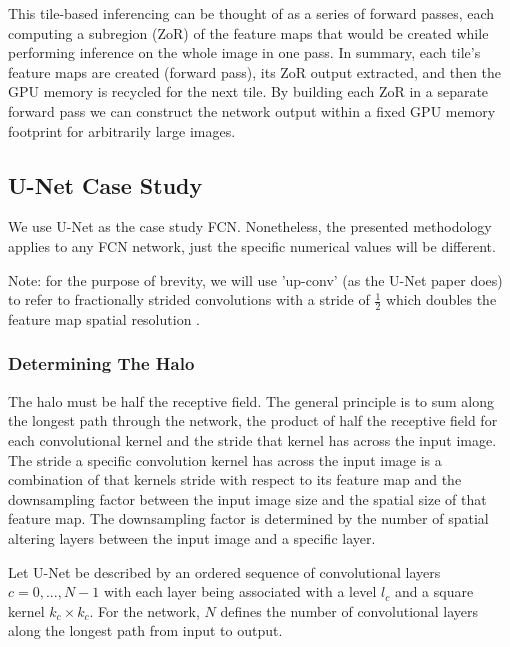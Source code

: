 \documentclass[runningheads]{llncs}
\begin{document}
This tile-based inferencing can be thought of as a series of forward passes, each computing a subregion (ZoR) of the feature maps that would be created while performing inference on the whole image in one pass. 
In summary, each tile's feature maps are created (forward pass), its ZoR output extracted, and then the GPU memory is recycled for the next tile. By building each ZoR in a separate forward pass we can construct the network output within a fixed GPU memory footprint for arbitrarily large images. 

\subsection{U-Net Case Study}

We use U-Net \cite{Ronneberger2015a} as the case study FCN. Nonetheless, the presented methodology applies to any FCN network, just the specific numerical values will be different. 

Note: for the purpose of brevity, we will use 'up-conv' (as the U-Net paper does) to refer to fractionally strided convolutions with a stride of $\frac{1}{2}$ which doubles the feature map spatial resolution \cite{Dumoulin2018}.

\subsubsection{Determining The Halo}

The halo must be half the receptive field. 
The general principle is to sum along the longest path through the network, the product of half the receptive field for each convolutional kernel and the stride that kernel has across the input image. The stride a specific convolution kernel has across the input image is a combination of that kernels stride with respect to its feature map and the downsampling factor between the input image size and the spatial size of that feature map. The downsampling factor is determined by the number of spatial altering layers between the input image and a specific layer. 

Let U-Net be described by an ordered sequence of convolutional layers $c={0, ..., N-1}$ with each layer being associated with a level $l_{c}$ and a square kernel $k_{c} \times k_{c}$. 
For the network, $N$ defines the number of convolutional layers along the longest path from input to output. 
\end{document}
